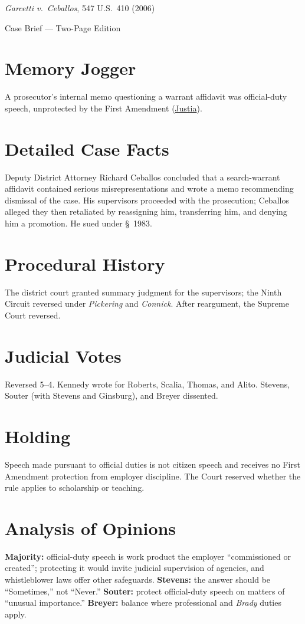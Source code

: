\documentclass[12pt]{article}
\begin{document}
\begin{center}
{\LARGE \textit{Garcetti v.\ Ceballos}, 547 U.S.\ 410 (2006)\par}
\vspace{0.5em}
{\large Case Brief --- Two-Page Edition\par}
\end{center}

\section{Memory Jogger}
A prosecutor's internal memo questioning a warrant affidavit was official-duty speech, unprotected by the First Amendment (\href{https://supreme.justia.com/cases/federal/us/547/410/}{Justia}).

\section{Detailed Case Facts}
Deputy District Attorney Richard Ceballos concluded that a search-warrant affidavit contained serious misrepresentations and wrote a memo recommending dismissal of the case. His supervisors proceeded with the prosecution; Ceballos alleged they then retaliated by reassigning him, transferring him, and denying him a promotion. He sued under \S~1983.

\section{Procedural History}
The district court granted summary judgment for the supervisors; the Ninth Circuit reversed under \textit{Pickering} and \textit{Connick}. After reargument, the Supreme Court reversed.

\section{Judicial Votes}
Reversed 5--4. Kennedy wrote for Roberts, Scalia, Thomas, and Alito. Stevens, Souter (with Stevens and Ginsburg), and Breyer dissented.

\section{Holding}
Speech made pursuant to official duties is not citizen speech and receives no First Amendment protection from employer discipline. The Court reserved whether the rule applies to scholarship or teaching.

\section{Analysis of Opinions}
\textbf{Majority:} official-duty speech is work product the employer ``commissioned or created''; protecting it would invite judicial supervision of agencies, and whistleblower laws offer other safeguards. \textbf{Stevens:} the answer should be ``Sometimes,'' not ``Never.'' \textbf{Souter:} protect official-duty speech on matters of ``unusual importance.'' \textbf{Breyer:} balance where professional and \textit{Brady} duties apply.
\end{document}
